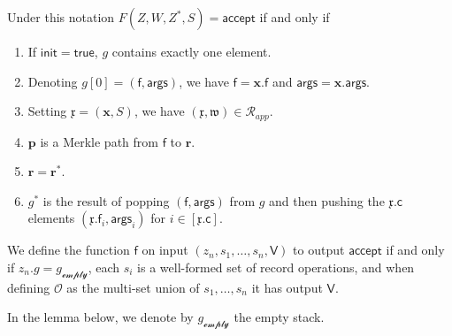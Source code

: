 \documentclass[11pt]{article} %
\newcommand{\acc}{\ensuremath{\mathsf{accept}}\xspace}
\newcommand{\rel}{\ensuremath{\mathcal{R}}\xspace}
\newcommand{\f}{\ensuremath{\mathsf{f}}\xspace}
\newcommand{\relapp}{\ensuremath{\rel_{app}}\xspace}
\newcommand{\init}{\ensuremath{\mathsf{init}}\xspace}
\newcommand{\true}{\ensuremath{\mathsf{true}}\xspace}
\newcommand{\ops}{\ensuremath{\mathcal{O}}\xspace}
\newcommand{\instapp}{\ensuremath{\mathfrak{x}}\xspace}
\newcommand{\witapp}{\ensuremath{\mathfrak{w}}\xspace}
\newcommand{\instnoops}{\ensuremath{\mathbf{x}}\xspace}
\renewcommand{\path}{\ensuremath{\mathbf{p}}\xspace}
\renewcommand{\root}{\ensuremath{\mathbf{r}}\xspace}
\renewcommand{\empty}{\ensuremath{g_{\mathscr{empty}}}\xspace}
\newcommand{\args}{\ensuremath{\mathsf{args}}\xspace}
\newcommand{\callnum}{\ensuremath{\mathsf{c}}\xspace}
\newcommand{\recset}{\ensuremath{\mathsf{V}}\xspace}
\newcommand{\finpred}{\ensuremath{\mathsf{f}}\xspace}
\begin{document}
\noindent Under this notation
$F(Z,W,Z^*,S)=\acc$ if and only if
\begin{enumerate}
\item If $\init=\true$, $g$ contains exactly one element.
 \item Denoting $g[0]=(\f,\args)$, we have $\f=\instnoops.\f$ and $\args=\instnoops.\args$.
 \item Setting $\instapp=(\instnoops,S)$, we have $(\instapp,\witapp)\in \relapp$.
 \item \path is a Merkle path from \f to \root.
 \item  $\root=\root^*$.
 \item $g^*$ is the result of popping $(\f,\args)$ from $g$ and then pushing the $\instapp.\callnum$ elements
 $(\instapp.\f_i,\args_i)$ for $i\in [\instapp.\callnum]$.
\end{enumerate}





We define the function \finpred on input $(z_n,s_1,\ldots,s_n,\recset)$ to output \acc if and only if  $z_n.g=\empty$,
each $s_i$ is a well-formed set of record operations, and when defining \ops as the multi-set union of $s_1,\ldots,s_n$ it  has output \recset.


In the lemma below, we denote by \empty the empty stack.
\end{document}
